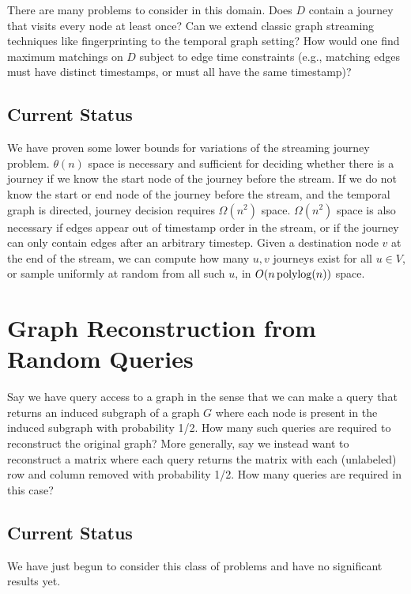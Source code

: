 There are many problems to consider in this domain. Does $D$ contain a journey that visits every node at least once?  Can we extend classic graph streaming techniques like fingerprinting to the temporal graph setting?  How would one find maximum matchings on $D$ subject to edge time constraints (e.g., matching edges must have distinct timestamps, or must all have the same timestamp)?

\subsection{Current Status}
We have proven some lower bounds for variations of the streaming journey problem.  $\theta(n)$ space is necessary and sufficient for deciding whether there is a journey if we know the start node of the journey before the stream.  If we do not know the start or end node of the journey before the stream, and the temporal graph is directed, journey decision requires $\Omega(n^2)$ space.  $\Omega(n^2)$ space is also necessary if edges appear out of timestamp order in the stream, or if the journey can only contain edges after an arbitrary timestep. Given a destination node $v$ at the end of the stream, we can compute how many $u,v$ journeys exist for all $u \in V$, or sample uniformly at random from all such $u$, in $O(n \operatorname{polylog}(n))$ space.  

\section{Graph Reconstruction from Random Queries}
\label{sec:recon}

Say we have query access to a graph in the sense that we can make a query that returns an induced subgraph of a graph $G$ where each node is present in the induced subgraph with probability 1/2. How many such queries are required to reconstruct the original graph? More generally, say we instead want to reconstruct a matrix where each query returns the matrix with each (unlabeled) row and column removed with probability 1/2. How many queries are required in this case?

\subsection{Current Status}
We have just begun to consider this class of problems and have no significant results yet.